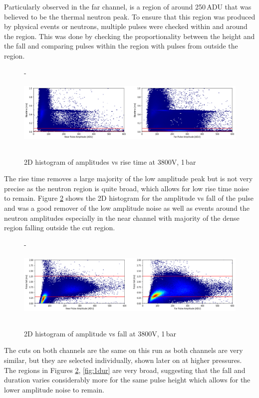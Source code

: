 \documentclass[a4paper]{article}
\begin{document}
\newline Particularly observed in the far channel, is a region of around 250\,ADU that was believed to be the thermal neutron peak. To ensure that this region was produced by physical events or neutrons, multiple pulses were checked within and around the region. This was done by checking the proportionality between the height and the fall and comparing pulses within the region with pulses from outside the region.
\begin{figure}[H]-
    \centering
    \includegraphics[height=3.7cm]{uk24n001_rise.png}
    \caption{2D histogram of amplitudes vs rise time at 3800V, 1\,bar}
    \label{fig:1rise}
\end{figure}
\noindent The rise time removes a large majority of the low amplitude peak but is not very precise as the neutron region is quite broad, which allows for low rise time noise to remain. Figure \ref{fig:1fall} shows the 2D histogram for the amplitude vs fall of the pulse and was a good remover of the low amplitude noise as well as events around the neutron amplitudes especially in the near channel with majority of the dense region falling outside the cut region.
\begin{figure}[H]-
    \centering
    \includegraphics[height=3.7cm]{uk24n001_fall.png}
    \caption{2D histogram of amplitude vs fall at 3800V, 1\,bar}
    \label{fig:1fall}
\end{figure}
\noindent The cuts on both channels are the same on this run as both channels are very similar, but they are selected individually, shown later on at higher pressures. The regions in Figures \ref{fig:1fall}, \ref{fig:1dur} are very broad, suggesting that the fall and duration varies considerably more for the same pulse height which allows for the lower amplitude noise to remain.
\end{document}
